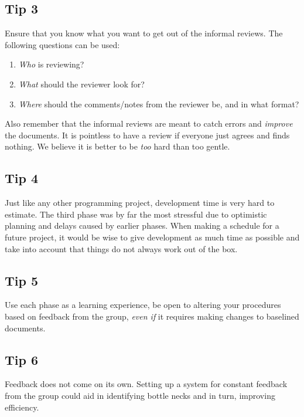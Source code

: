 \documentclass{article}
\begin{document}
    \subsection{Tip 3}
        Ensure that you know what you want to get out of the informal reviews. The following
        questions can be used:
        \begin{enumerate}
            \item \emph{Who} is reviewing?
            \item \emph{What} should the reviewer look for?
            \item \emph{Where} should the comments/notes from the reviewer be, and in what format?
        \end{enumerate}
        Also remember that the informal reviews are meant to catch errors and \emph{improve}
        the documents. It is pointless to have a review if everyone just agrees and finds nothing. 
        We believe it is better to be \emph{too} hard than too gentle.
        
    \subsection{Tip 4}
        Just like any other programming project, development time is very hard to estimate. 
        The third phase was by far the most stressful due to optimistic planning and delays caused by earlier phases. 
        When making a schedule for a future project, it would be wise to give development as much time as possible and 
        take into account that things do not always work out of the box.
        
    \subsection{Tip 5}
        Use each phase as a learning experience, be open to altering your procedures based on feedback from the group, \emph{even if} it requires making changes to baselined documents.
        
    \subsection{Tip 6}
        Feedback does not come on its own. Setting up a system for constant feedback from the group could aid in identifying bottle necks and in turn, improving efficiency.
    
\end{document}
